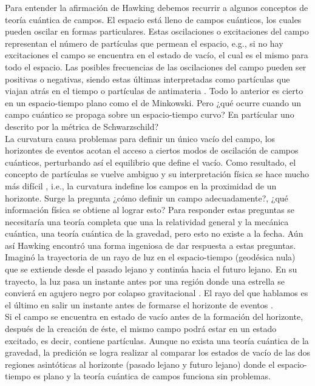 Para entender la afirmaci\'{o}n de Hawking debemos recurrir a algunos conceptos de teor\'{i}a cu\'{a}ntica de campos. El espacio est\'{a} lleno de campos cu\'{a}nticos, los cuales pueden oscilar en formas particulares. Estas oscilaciones o excitaciones del campo representan el n\'{u}mero de part\'{i}culas que permean el espacio, e.g., si no hay excitaciones el campo se encuentra en el estado de vac\'{i}o, el cual es el mismo para todo el espacio. Las posibles frecuencias de las oscilaciones del campo pueden ser positivas o negativas, siendo estas \'{u}ltimas interpretadas como part\'{i}culas que viajan atr\'{a}s en el tiempo o part\'{i}culas de antimateria \citep{aitchison2012gauge}. Todo lo anterior es cierto en un espacio-tiempo plano como el de Minkowski. Pero ¿qu\'{e} ocurre cuando un campo cu\'{a}ntico se propaga sobre un espacio-tiempo curvo? En part\'{i}cular uno descrito por la m\'{e}trica de Schwarzschild?\\

La curvatura causa problemas para definir un \'{u}nico vac\'{i}o del campo, los horizontes de eventos acotan el acceso a ciertos modos de oscilaci\'{o}n de campos cuánticos, perturbando as\'{i} el equilibrio que define el vacío. Como resultado, el concepto de partículas se vuelve ambiguo y su interpretación física se hace mucho más difícil \citep{dewitt1975quantum}, i.e., la curvatura indefine los campos en la proximidad de un horizonte. Surge la pregunta ¿c\'{o}mo definir un campo adecuadamente?, ¿qu\'{e} informaci\'{o}n f\'{i}sica se obtiene al lograr esto? Para responder estas preguntas se necesitaría una teor\'{i}a completa que una la relatividad general y la mecánica cuántica,
una teoría cu\'{a}ntica de la gravedad,
pero esto no existe a la fecha. A\'{u}n as\'{i}  Hawking encontr\'{o} una forma ingeniosa de dar respuesta a estas preguntas. Imaginó la trayectoria  de un rayo de luz en el espacio-tiempo (geod\'{e}sica nula) que se extiende desde el pasado lejano y contin\'{u}a hacia el futuro lejano. En su trayecto, la luz pasa un instante antes por una regi\'{o}n donde una estrella se convier\'{a} en agujero negro por colapso gravitacional . El rayo del que hablamos es el \'{u}ltimo en salir un instante antes de formarse el horizonte de eventos \citep{Hawking1975}.\\

Si el campo se encuentra en estado de vac\'{i}o antes de la formaci\'{o}n del horizonte, despu\'{e}s de la creaci\'{o}n de \'{e}ste, el mismo campo podr\'{a} estar en un estado excitado, es decir, contiene part\'{i}culas. Aunque no exista una teoría cu\'{a}ntica de la gravedad, la predici\'{o}n se logra realizar al comparar los estados de vac\'{i}o de las dos regiones asint\'{o}ticas al horizonte (pasado lejano y futuro lejano) donde el espacio-tiempo es plano y la teor\'{i}a cu\'{a}ntica de campos funciona sin problemas.\\

